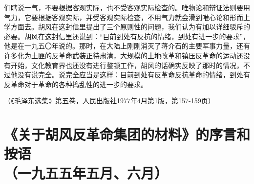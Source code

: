 \documentclass[cn,11pt,chinese]{elegantbook}
\def\myformat#1{\hfil\hfil #1}
\begin{document}
们瞎说一气，不要根据客观实际，也不受客观实际检查的。唯物论和辩证法则要用气力，它要根据客观实际，并受客观实际检查，不用气力就会滑到唯心论和形而上学方面去。胡风在这封信里提出了三个原则性的问题，我们认为有加以详细驳斥的必要。胡风在这封信里还说到：“目前到处有反抗的情绪，到处有进一步的要求”，他是在一九五〇年说的。那时，在大陆上刚刚消灭了蒋介石的主要军事力量，还有许多化为土匪的反革命武装正待肃清，大规模的土地改革和镇压反革命的运动还没有开始，文化教育界也还没有进行整顿工作，胡风的话确实反映了那时的情况，不过他没有说完全。说完全应当是这样：目前到处有反革命反抗革命的情绪，到处有反革命对于革命的各种捣乱性的进一步的要求。\\
\begin{flushright}（《毛泽东选集》第五卷，人民出版社1977年4月第1版，第157-159页）\end{flushright}
\newpage\section*{\myformat{《关于胡风反革命集团的材料》的序言和按语}\\\myformat{（一九五五年五月、六月）}}
\end{document}
